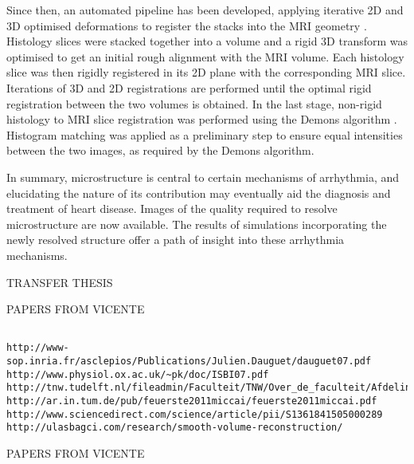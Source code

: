     Since then, an automated pipeline has been developed, applying iterative 2D and 3D optimised deformations to register the stacks into the MRI geometry \cite{Mansoori2007}. Histology slices were stacked together into a volume and a rigid 3D transform was optimised to get an initial rough alignment with the MRI volume. Each histology slice was then rigidly registered in its 2D plane with the corresponding MRI slice. Iterations of 3D and 2D registrations are performed until the optimal rigid registration between the two volumes is obtained. In the last stage, non-rigid histology to MRI slice registration was performed using the Demons algorithm \cite{Thirion1995}. Histogram matching was applied as a preliminary step to ensure equal intensities between the two images, as required by the Demons algorithm.
  

In summary, microstructure is central to certain mechanisms of arrhythmia, and elucidating the nature of its contribution may eventually aid the diagnosis and treatment of heart disease. Images of the quality required to resolve microstructure are now available. The results of simulations incorporating the newly resolved structure offer a path of insight into these arrhythmia mechanisms.

TRANSFER THESIS

PAPERS FROM VICENTE
\begin{verbatim}

http://www-sop.inria.fr/asclepios/Publications/Julien.Dauguet/dauguet07.pdf
http://www.physiol.ox.ac.uk/~pk/doc/ISBI07.pdf
http://tnw.tudelft.nl/fileadmin/Faculteit/TNW/Over_de_faculteit/Afdelingen/Imaging_Science_and_Technology/Research/Research_Groups/Quantitative_Imaging/Publications/List_Publications/doc/Three_dimensional_registration.pdf
http://ar.in.tum.de/pub/feuerste2011miccai/feuerste2011miccai.pdf
http://www.sciencedirect.com/science/article/pii/S1361841505000289
http://ulasbagci.com/research/smooth-volume-reconstruction/

\end{verbatim}
	
PAPERS FROM VICENTE
